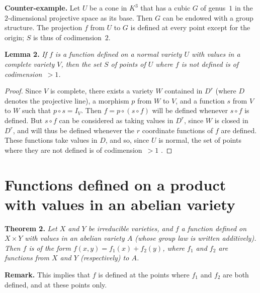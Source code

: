 \documentclass{article}
\newenvironment{itenv}[1]
  {\phantomsection\par\medskip\noindent\textbf{#1.}\itshape}
  {\medskip}
\newenvironment{rmenv}[1]
  {\phantomsection\par\medskip\noindent\textbf{#1.}\rmfamily}
  {\medskip}
\begin{document}
\begin{rmenv}{Counter-example}
  Let $U$ be a cone in $K^3$ that has a cubic $G$ of genus~$1$ in the $2$-dimensional projective space as its base.
  Then $G$ can be endowed with a group structure.
  The projection $f$ from $U$ to $G$ is defined at every point except for the origin;
  $S$ is thus of codimension~$2$.
\end{rmenv}

\begin{itenv}{Lemma 2}
\label{lemma2}
  If $f$ is a function defined on a normal variety $U$ with values in a complete variety $V$, then the set $S$ of points of $U$ where $f$ is not defined is of codimension~$>1$.
\end{itenv}

\begin{proof}
  Since $V$ is complete, there exists a variety $W$ contained in $D^r$ (where $D$ denotes the projective line), a morphism $p$ from $W$ to $V$, and a function $s$ from $V$ to $W$ such that $p\circ s=I_V$.
  Then $f=p\circ(s\circ f)$ will be defined whenever $s\circ f$ is defined.
  But $s\circ f$ can be considered as taking values in $D^r$, since $W$ is closed in $D^r$, and will thus be defined whenever the $r$ coordinate functions of $f$ are defined.
  These functions take values in $D$, and so, since $U$ is normal, the set of points where they are not defined is of codimension~$>1$ \cite[p.~166, Corollary to Proposition~2, Section~1, Chapter~V]{1}.
\end{proof}


\section{Functions defined on a product with values in an abelian variety}
\label{4}

\begin{itenv}{Theorem 2}
\label{theorem2}
  Let $X$ and $Y$ be irreducible varieties, and $f$ a function defined on $X\times Y$ with values in an abelian variety $A$ (whose group law is written additively).
  Then $f$ is of the form $f(x,y)=f_1(x)+f_2(y)$, where $f_1$ and $f_2$ are functions from $X$ and $Y$ (respectively) to $A$.
\end{itenv}

\begin{rmenv}{Remark}
  This implies that $f$ is defined at the points where $f_1$ and $f_2$ are both defined, and at these points only.
\end{rmenv}
\end{document}
